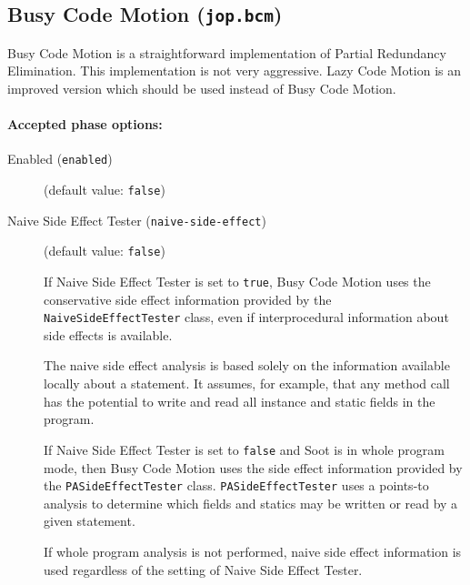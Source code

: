 \documentclass{article}
\begin{document}
\subsection{Busy Code Motion ({\tt jop.bcm})}

Busy Code Motion is a straightforward implementation of Partial
Redundancy Elimination. This implementation is not very
aggressive.  Lazy Code Motion is an improved version which
should be used instead of Busy Code Motion.


\paragraph{Accepted phase options:} 

\begin{description}

\item[Enabled ({\tt enabled})]
(default value: {\tt false})






\item[Naive Side Effect Tester ({\tt naive-side-effect})]
(default value: {\tt false})





\par

If Naive Side Effect Tester is set to {\tt true}, Busy Code
Motion uses the conservative side effect information provided by
the {\tt NaiveSideEffectTester} class, even if interprocedural
information about side effects is available.

\par

The naive side effect analysis is based solely on the information
available locally about a statement. It assumes, for example,
that any method call has the potential to write and read all
instance and static fields in the program.

\par

If Naive Side Effect Tester is set to {\tt false} and Soot is
in whole program mode, then Busy Code Motion uses the side effect
information provided by the {\tt PASideEffectTester}
class. {\tt PASideEffectTester} uses a points-to analysis to
determine which fields and statics may be written or read by a
given statement.

\par

If whole program analysis is not performed, naive side effect
information is used regardless of the setting of
Naive Side Effect Tester.




\end{description}
\end{document}
